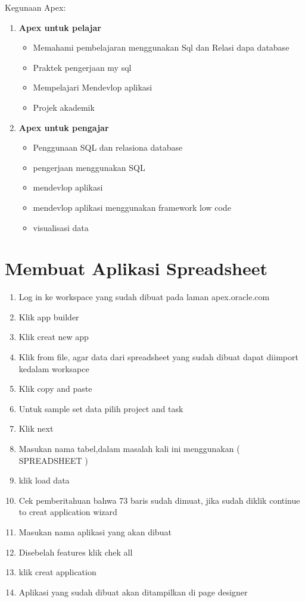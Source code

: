 Kegunaan Apex:
\begin{enumerate}
\item \textbf{Apex untuk pelajar}
\begin{itemize}

\item Memahami pembelajaran menggunakan Sql dan Relasi dapa database
\item Praktek pengerjaan my sql
\item Mempelajari Mendevlop aplikasi 
\item Projek akademik

\end{itemize}


\item \textbf{Apex untuk pengajar}
\begin{itemize}

\item Penggunaan SQL dan relasiona database
\item pengerjaan menggunakan SQL
\item mendevlop aplikasi 
\item mendevlop aplikasi menggunakan framework low code
\item visualisasi data
\end{itemize}

\end{enumerate}

\section{Membuat Aplikasi Spreadsheet}
\begin{enumerate}

\item Log in ke workspace yang sudah dibuat pada laman apex.oracle.com
\item Klik app builder 
\item Klik creat new app 
\item Klik from file, agar data dari spreadsheet yang sudah dibuat dapat diimport kedalam worksapce
\item Klik copy and paste
\item Untuk sample set data pilih project and task
\item Klik next 
\item Masukan nama tabel,dalam masalah kali ini menggunakan ( SPREADSHEET )
\item klik load data
\item Cek pemberitahuan bahwa 73 baris sudah dimuat, jika sudah diklik continue to creat application wizard
\item Masukan nama aplikasi yang akan dibuat 
\item Disebelah features klik chek all
\item klik creat application 
\item Aplikasi yang sudah dibuat akan ditampilkan di page designer
\end{enumerate}